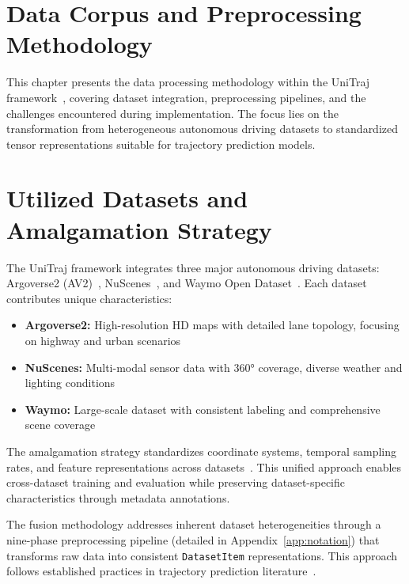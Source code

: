 \section{Data Corpus and Preprocessing Methodology}
\label{ch:data_methodology}

This chapter presents the data processing methodology within the UniTraj framework~\cite{unitrajFeng2024}, covering dataset integration, preprocessing pipelines, and the challenges encountered during implementation. The focus lies on the transformation from heterogeneous autonomous driving datasets to standardized tensor representations suitable for trajectory prediction models.

\section{Utilized Datasets and Amalgamation Strategy}
\label{sec:data_datasets}

The UniTraj framework integrates three major autonomous driving datasets: Argoverse2 (AV2)~\cite{av2Wilson2023}, NuScenes~\cite{caesar2020nuscenes}, and Waymo Open Dataset~\cite{wmodSun2020}. Each dataset contributes unique characteristics:

\begin{itemize}
    \item \textbf{Argoverse2:} High-resolution HD maps with detailed lane topology, focusing on highway and urban scenarios
    \item \textbf{NuScenes:} Multi-modal sensor data with 360° coverage, diverse weather and lighting conditions
    \item \textbf{Waymo:} Large-scale dataset with consistent labeling and comprehensive scene coverage
\end{itemize}

The amalgamation strategy standardizes coordinate systems, temporal sampling rates, and feature representations across datasets~\cite{VectorNet2020, Shi2022MTR}. This unified approach enables cross-dataset training and evaluation while preserving dataset-specific characteristics through metadata annotations.

The fusion methodology addresses inherent dataset heterogeneities through a nine-phase preprocessing pipeline (detailed in Appendix~\ref{app:notation}) that transforms raw data into consistent \texttt{DatasetItem} representations. This approach follows established practices in trajectory prediction literature~\cite{zhou2022hivt, qcnetZhou2023, Shi2023MTRplusplus}.

